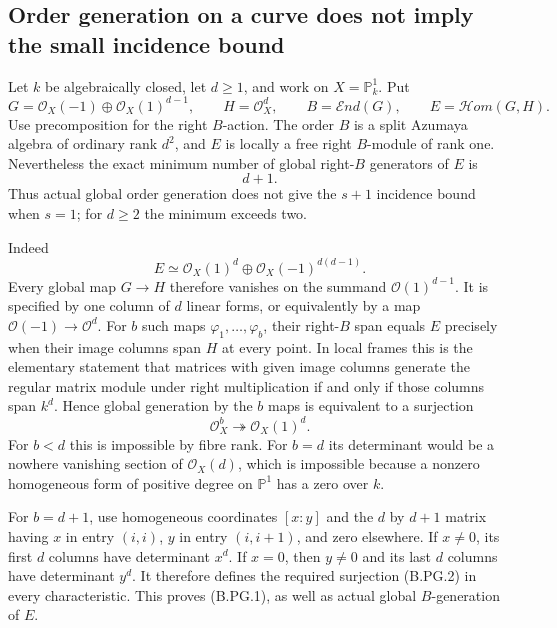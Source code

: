 \subsection*{Order generation on a curve does not imply the small incidence bound}

Let $k$ be algebraically closed, let $d\ge1$, and work on
$X=\mathbb P^1_k$.  Put
\[
 G=\mathcal O_X(-1)\oplus\mathcal O_X(1)^{d-1},\qquad
 H=\mathcal O_X^d,\qquad
 B=\mathcal End(G),\qquad E=\mathcal Hom(G,H).
\]
Use precomposition for the right $B$-action.  The order $B$ is a split
Azumaya algebra of ordinary rank $d^2$, and $E$ is locally a free
right $B$-module of rank one.  Nevertheless the exact minimum number
of global right-$B$ generators of $E$ is
\[
                                  d+1.                 \tag{B.PG.1}
\]
Thus actual global order generation does not give the $s+1$ incidence
bound when $s=1$; for $d\ge2$ the minimum exceeds two.

Indeed
\[
 E\simeq\mathcal O_X(1)^d\oplus
                         \mathcal O_X(-1)^{d(d-1)}.
\]
Every global map $G\to H$ therefore vanishes on the summand
$\mathcal O(1)^{d-1}$.  It is specified by one column of $d$ linear
forms, or equivalently by a map $\mathcal O(-1)\to\mathcal O^d$.
For $b$ such maps $\varphi_1,\ldots,\varphi_b$, their right-$B$ span
equals $E$ precisely when their image columns span $H$ at every point.
In local frames this is the elementary statement that matrices with
given image columns generate the regular matrix module under right
multiplication if and only if those columns span $k^d$.  Hence global
generation by the $b$ maps is equivalent to a surjection
\[
                   \mathcal O_X^b\twoheadrightarrow
                                      \mathcal O_X(1)^d. \tag{B.PG.2}
\]
For $b<d$ this is impossible by fibre rank.  For $b=d$ its determinant
would be a nowhere vanishing section of $\mathcal O_X(d)$, which is
impossible because a nonzero homogeneous form of positive degree on
$\mathbb P^1$ has a zero over $k$.

For $b=d+1$, use homogeneous coordinates $[x:y]$ and the $d$ by $d+1$
matrix having $x$ in entry $(i,i)$, $y$ in entry $(i,i+1)$, and zero
elsewhere.  If $x\ne0$, its first $d$ columns have determinant $x^d$.
If $x=0$, then $y\ne0$ and its last $d$ columns have determinant $y^d$.
It therefore defines the required surjection (B.PG.2) in every
characteristic.  This proves (B.PG.1), as well as actual global
$B$-generation of $E$.

